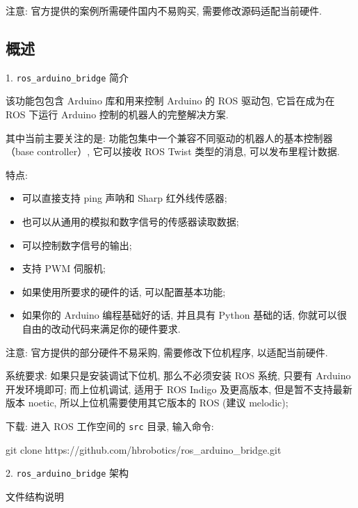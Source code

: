 \documentclass[openany, fontset=windowsold]{ctexbook}
\theoremstyle{kaiti}
\theoremstyle{normal}
\begin{document}
注意: 官方提供的案例所需硬件国内不易购买, 需要修改源码适配当前硬件.

\subsection{概述}

1. \verb|ros_arduino_bridge| 简介

该功能包包含 Arduino 库和用来控制 Arduino 的 ROS 驱动包, 它旨在成为在 ROS 下运行 Arduino 控制的机器人的完整解决方案.

其中当前主要关注的是: 功能包集中一个兼容不同驱动的机器人的基本控制器（base controller）, 它可以接收 ROS Twist 类型的消息, 可以发布里程计数据.

特点:

\begin{itemize}
  \item 可以直接支持 ping 声呐和 Sharp 红外线传感器; 

  \item 也可以从通用的模拟和数字信号的传感器读取数据; 

  \item 可以控制数字信号的输出; 

  \item 支持 PWM 伺服机; 

  \item 如果使用所要求的硬件的话, 可以配置基本功能; 

  \item 如果你的 Arduino 编程基础好的话, 并且具有 Python 基础的话, 你就可以很自由的改动代码来满足你的硬件要求.
\end{itemize}

注意: 官方提供的部分硬件不易采购, 需要修改下位机程序, 以适配当前硬件.

系统要求: 如果只是安装调试下位机, 那么不必须安装 ROS 系统, 只要有 Arduino 开发环境即可; 而上位机调试, 适用于 ROS Indigo 及更高版本, 但是暂不支持最新版本 noetic, 所以上位机需要使用其它版本的 ROS (建议 melodic); 

下载: 进入 ROS 工作空间的 \verb|src| 目录, 输入命令:

\begin{bash}
  git clone https://github.com/hbrobotics/ros_arduino_bridge.git
\end{bash}

2. \verb|ros_arduino_bridge| 架构

文件结构说明
\end{document}
